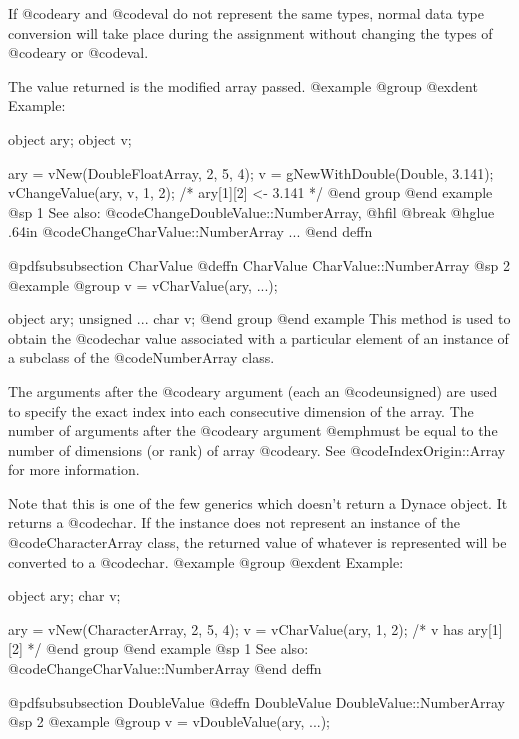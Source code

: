 If @code{ary} and @code{val} do not represent the same types, normal
data type conversion will take place during the assignment without
changing the types of @code{ary} or @code{val}.

The value returned is the modified array passed.
@example
@group
@exdent Example:

object  ary;
object  v;

ary = vNew(DoubleFloatArray, 2, 5, 4);
v = gNewWithDouble(Double, 3.141);
vChangeValue(ary, v, 1, 2);
/*  ary[1][2] <- 3.141  */
@end group
@end example
@sp 1
See also:  @code{ChangeDoubleValue::NumberArray,}
@hfil @break @hglue .64in      @code{ChangeCharValue::NumberArray  ...}
@end deffn












@pdfsubsubsection {CharValue}
@deffn {CharValue} CharValue::NumberArray
@sp 2
@example
@group
v = vCharValue(ary, ...);

object    ary;
unsigned  ...
char      v;
@end group
@end example
This method is used to obtain the @code{char} value associated with a
particular element of an instance of a subclass of the
@code{NumberArray} class.

The arguments after the @code{ary} argument (each an @code{unsigned})
are used to specify the exact index into each consecutive dimension of
the array.  The number of arguments after the @code{ary} argument
@emph{must} be equal to the number of dimensions (or rank) of array
@code{ary}.  See @code{IndexOrigin::Array} for more information.

Note that this is one of the few generics which doesn't return a Dynace
object.  It returns a @code{char}.  If the instance does not represent
an instance of the @code{CharacterArray} class, the returned value of
whatever is represented will be converted to a @code{char}.
@example
@group
@exdent Example:

object  ary;
char    v;

ary = vNew(CharacterArray, 2, 5, 4);
v = vCharValue(ary, 1, 2);
/*  v has ary[1][2]  */
@end group
@end example
@sp 1
See also:  @code{ChangeCharValue::NumberArray}
@end deffn









@pdfsubsubsection {DoubleValue}
@deffn {DoubleValue} DoubleValue::NumberArray
@sp 2
@example
@group
v = vDoubleValue(ary, ...);

